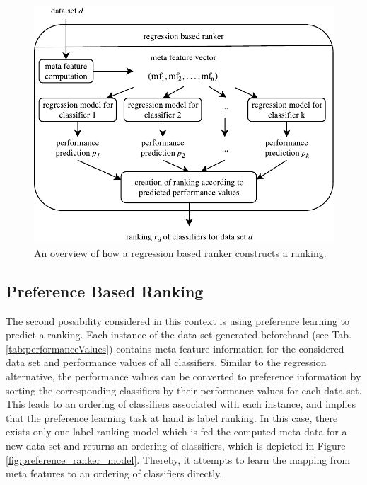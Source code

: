 \begin{figure}
\centering
\includegraphics[scale=1]{gfx/regression_models.pdf}
\caption{An overview of how a regression based ranker constructs a ranking.}
\label{fig:regression_ranker_model}
\end{figure}

\subsection{Preference Based Ranking}
The second possibility considered in this context is using preference learning to predict a ranking. Each instance of the data set generated beforehand (see Tab. \ref{tab:performanceValues}) contains meta feature information for the considered data set and performance values of all classifiers. Similar to the regression alternative, the performance values can be converted to preference information by sorting the corresponding classifiers by their performance values for each data set. This leads to an ordering of classifiers associated with each instance, and implies that the preference learning task at hand is label ranking. In this case, there exists only one label ranking model which is fed the computed meta data for a new data set and returns an ordering of classifiers, which is depicted in Figure \ref{fig:preference_ranker_model}. Thereby, it attempts to learn the mapping from meta features to an ordering of classifiers directly.

